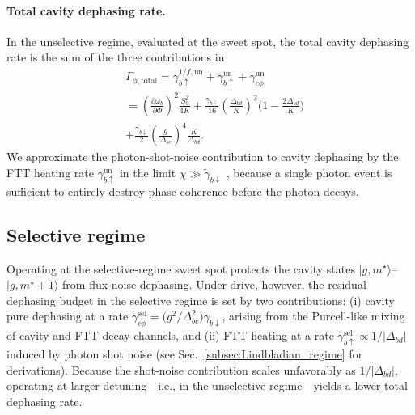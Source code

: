 \paragraph{Total cavity dephasing rate.}
In the unselective regime, evaluated at the sweet spot, the total cavity dephasing rate is the sum of the three contributions in \begin{align}
\label{eq:Gamma_phi_total_unselective}
&\Gamma_{\phi,\mathrm{total}}
=\gamma_{b\uparrow}^{1/f,\mathrm{un}}+\gamma_{b\uparrow}^{\mathrm{un}}+\gamma_{c\phi}^{\mathrm{un}} \nonumber\\
&=\left(\frac{\partial\omega_b}{\partial\Phi}\right)^2\frac{S_0^2}{4K}
+\frac{\gamma_{b\downarrow}}{16}\left(\frac{\Delta_{bd}}{K}\right)^2\bigg(1-\frac{2\Delta_{bd}}{K}\bigg)\nonumber
\\&+\frac{\gamma_{b\downarrow}}{2}\left(\frac{g}{\Delta_{bc}}\right)^4\frac{K}{\Delta_{bd}}.
\end{align}
We approximate the photon-shot-noise contribution to cavity dephasing by the FTT heating rate $\gamma_{b\uparrow}^{\mathrm{un}}$ in the limit $\chi \gg \widetilde{\gamma}_{b\downarrow}$ \cite{serge}, because a single photon event is sufficient to entirely destroy phase coherence before the photon decays.

\subsection{Selective regime}
\label{subsec:selective_analytical}

Operating at the selective-regime sweet spot protects the cavity states
$\lvert g,m^\star\rangle$--$\lvert g,m^\star\!+\!1\rangle$ from flux-noise dephasing.
Under drive, however, the residual dephasing budget in the selective regime is set by two
contributions: (i) cavity pure dephasing at a rate
$\gamma_{c\phi}^{\mathrm{sel}}=\bigl(g^2/\Delta_{bc}^2\bigr)\gamma_{b\downarrow}$,
arising from the Purcell-like mixing of cavity and FTT decay channels, and
(ii) FTT heating at a rate $\gamma_{b\uparrow}^{\mathrm{sel}}\propto 1/\lvert\Delta_{bd}\rvert$
induced by photon shot noise (see Sec.~\ref{subsec:Lindbladian_regime} for derivations). Because the shot-noise contribution scales unfavorably as $1/\lvert\Delta_{bd}\rvert$, operating at larger detuning---i.e., in the unselective regime---yields a lower total dephasing rate.
